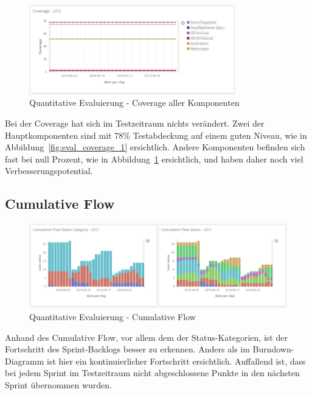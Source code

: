 \begin{savenotes}
    \begin{figure}[H]
      \centering
      \includegraphics[width=0.8\textwidth]{img/eval-coverage-2.png}
      \caption{Quantitative Evaluierung {-} Coverage aller Komponenten}\label{fig:eval_coverage_2}
    \end{figure}
\end{savenotes}

Bei der Coverage hat sich im Testzeitraum nichts verändert.
Zwei der Hauptkomponenten sind mit 78\% Testabdeckung auf einem guten Niveau, wie in Abbildung~\ref{fig:eval_coverage_1} ersichtlich.
Andere Komponenten befinden sich fast bei null Prozent, wie in Abbildung~\ref{fig:eval_coverage_2} ersichtlich, und haben daher noch viel Verbesserungspotential.

\clearpage
\subsection*{Cumulative Flow}

\begin{savenotes}
    \begin{figure}[H]
      \centering
      \includegraphics[width=1.0\textwidth]{img/eval-cumulative.png}
      \caption{Quantitative Evaluierung {-} Cumulative Flow}\label{fig:eval_cumulative}
    \end{figure}
\end{savenotes}

Anhand des Cumulative Flow, vor allem dem der Status-Kategorien, ist der Fortschritt des Sprint-Backlogs besser zu erkennen.
Anders als im Burndown-Diagramm ist hier ein kontinuierlicher Fortschritt ersichtlich.
Auffallend ist, dass bei jedem Sprint im Testzeitraum nicht abgeschlossene Punkte in den nächsten Sprint übernommen wurden.

